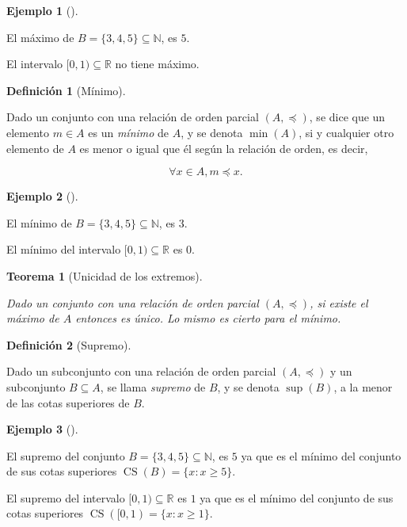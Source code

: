 \documentclass[
  a4paper,
]{scrreport}
\theoremstyle{plain}
\newtheorem{theorem}{Teorema}[chapter]
\theoremstyle{plain}
\theoremstyle{definition}
\newtheorem{definition}{Definición}[chapter]
\theoremstyle{definition}
\newtheorem{example}{Ejemplo}[chapter]
\theoremstyle{plain}
\theoremstyle{remark}
\begin{document}
\begin{example}[]\protect\hypertarget{exm-maximo}{}\label{exm-maximo}

El máximo de \(B=\{3, 4, 5\}\subseteq \mathbb{N}\), es \(5\).

El intervalo \([0,1)\subseteq \mathbb{R}\) no tiene máximo.

\end{example}

\begin{definition}[Mínimo]\protect\hypertarget{def-minimo-conjunto}{}\label{def-minimo-conjunto}

Dado un conjunto con una relación de orden parcial \((A,\preceq)\), se
dice que un elemento \(m\in A\) es un \emph{mínimo} de \(A\), y se
denota \(\min(A)\), si y cualquier otro elemento de \(A\) es menor o
igual que él según la relación de orden, es decir,

\[\forall x \in A, m\preceq x.\]

\end{definition}

\begin{example}[]\protect\hypertarget{exm-maximo}{}\label{exm-maximo}

El mínimo de \(B=\{3, 4, 5\}\subseteq \mathbb{N}\), es \(3\).

El mínimo del intervalo \([0,1)\subseteq \mathbb{R}\) es \(0\).

\end{example}

\begin{theorem}[Unicidad de los
extremos]\protect\hypertarget{thm-unicidad-extremos}{}\label{thm-unicidad-extremos}

Dado un conjunto con una relación de orden parcial \((A,\preceq)\), si
existe el máximo de \(A\) entonces es único. Lo mismo es cierto para el
mínimo.

\end{theorem}

\begin{definition}[Supremo]\protect\hypertarget{def-supremo-conjunto}{}\label{def-supremo-conjunto}

Dado un subconjunto con una relación de orden parcial \((A,\preceq)\) y
un subconjunto \(B\subseteq A\), se llama \emph{supremo} de \(B\), y se
denota \(\sup(B)\), a la menor de las cotas superiores de \(B\).

\end{definition}

\begin{example}[]\protect\hypertarget{exm-supremo}{}\label{exm-supremo}

El supremo del conjunto \(B=\{3, 4, 5\}\subseteq \mathbb{N}\), es \(5\)
ya que es el mínimo del conjunto de sus cotas superiores
\(\operatorname{CS}(B)=\{x:x\geq 5\}\).

El supremo del intervalo \([0,1)\subseteq \mathbb{R}\) es \(1\) ya que
es el mínimo del conjunto de sus cotas superiores
\(\operatorname{CS}([0,1) = \{x:x\geq 1\}\).

\end{example}
\end{document}
